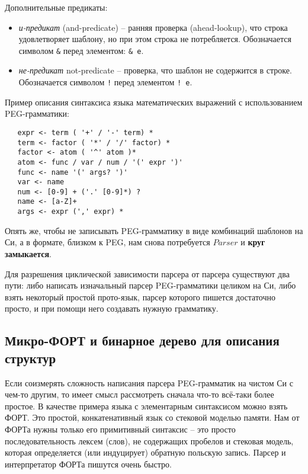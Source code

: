 \documentclass[10pt]{report}
\begin{document}
Дополнительные предикаты:
\begin{itemize}
\item {\em и-предикат} (and-predicate) -- ранняя проверка (ahead-lookup), что строка удовлетворяет шаблону, но при этом строка не потребляется.  Обозначается символом \texttt{\&} перед элементом: \texttt{\& e}.
\item {\em не-предикат} {not-predicate}  -- проверка, что шаблон не содержится в строке. Обозначается символом \texttt{!} перед элементом \texttt{! e}. 
\end{itemize}

Пример описания синтаксиса языка математических выражений с использованием PEG-грамматики:
\begin{verbatim}
   expr <- term ( '+' / '-' term) *
   term <- factor ( '*' / '/' factor) *
   factor <- atom ( '^' atom )*
   atom <- func / var / num / '(' expr ')'
   func <- name '(' args? ')' 
   var <- name
   num <- [0-9] + ('.' [0-9]*) ? 
   name <- [a-Z]+
   args <- expr (',' expr) *
\end{verbatim}

Опять же, чтобы не записывать PEG-грамматику в виде комбинаций шаблонов на Си, а в формате, близком к PEG, 
нам снова потребуется $\boxed{Parser}$ и \textbf{круг замыкается}. 

Для разрешения циклической зависимости парсера от парсера существуют два пути: либо написать изначальный парсер PEG-грамматики целиком на Си, либо взять некоторый простой прото-язык, парсер которого пишется достаточно просто, и при помощи него создавать нужную грамматику.

\subsection{Микро-ФОРТ и бинарное дерево для описания структур}
Если соизмерять сложность написания парсера PEG-грамматик на чистом Си с чем-то другим, то имеет смысл рассмотреть сначала что-то всё-таки более простое.
В качестве примера языка с элементарным синтаксисом можно взять ФОРТ.
Это простой, конкатенативный язык со стековой моделью памяти.
Нам от ФОРТа нужны только его примитивный синтаксис -- это просто последовательность лексем (слов), не содержащих пробелов и стековая модель, которая определяется (или индуцирует) обратную польскую запись.
Парсер и интерпретатор ФОРТа пишутся очень быстро.
\end{document}
